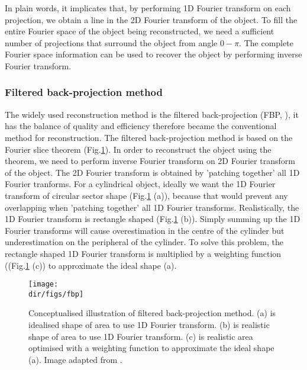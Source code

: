 In plain words, it implicates that, by performing 1D Fourier transform on each projection, we obtain a line in the 2D Fourier transform of the object. To fill the entire Fourier space of the object being reconstructed, we need a sufficient number of projections that surround the object from angle $0-\pi$. The complete Fourier space information can be used to recover the object by performing inverse Fourier transform.

\subsubsection{Filtered back-projection method}
The widely used reconstruction method is the filtered back-projection (FBP, \citet{herman1976convolution}), it has the balance of quality and efficiency therefore became the conventional method for reconstruction. The filtered back-projection method is based on the Fourier slice theorem (Fig.\ref{fbp}). In order to reconstruct the object using the theorem, we need to perform inverse Fourier transform on 2D Fourier transform of the object. The 2D Fourier transform is obtained by 'patching together' all 1D Fourier tranforms. For a cylindrical object, ideally we want the 1D Fourier transform of circular sector shape (Fig.\ref{fbp} (a)), because that would prevent any overlapping when 'patching together' all 1D Fourier transforms. Realistically, the 1D Fourier transform is rectangle shaped (Fig.\ref{fbp} (b)). Simply summing up the 1D Fourier transforms will cause overestimation in the centre of the cylinder but underestimation on the peripheral of the cylinder. To solve this problem, the rectangle shaped 1D Fourier transform is multiplied by a weighting function ((Fig.\ref{fbp} (c)) to approximate the ideal shape (a).

\begin{figure}[htbp]
  \centering
  \texttt{[image: \\dir/figs/fbp]}
  \caption{Conceptualised illustration of filtered back-projection method. (a) is idealised shape of area to use 1D Fourier transform. (b) is realistic shape of area to use 1D Fourier transform. (c) is realistic area optimised with a weighting function to approximate the ideal shape (a). Image adapted from \citet{hsieh2003computed}.}
  \label{fbp}
\end{figure}

